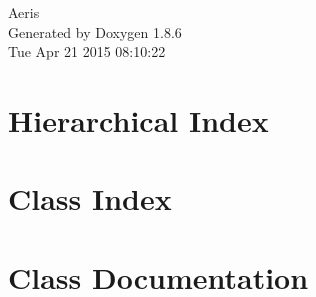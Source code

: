 \documentclass[twoside]{book}
\newcommand{\clearemptydoublepage}{%
  \newpage{\pagestyle{empty}\cleardoublepage}%
}
\begin{document}
\hypersetup{pageanchor=false}
\begin{titlepage}
\vspace*{7cm}
\begin{center}%
{\Large Aeris }\\
\vspace*{1cm}
{\large Generated by Doxygen 1.8.6}\\
\vspace*{0.5cm}
{\small Tue Apr 21 2015 08:10:22}\\
\end{center}
\end{titlepage}
\clearemptydoublepage
\tableofcontents
\clearemptydoublepage
{}
\hypersetup{pageanchor=true}

\chapter{Hierarchical Index}

\chapter{Class Index}

\chapter{Class Documentation}







































\newpage
{}
{}
\printindex
\end{document}
